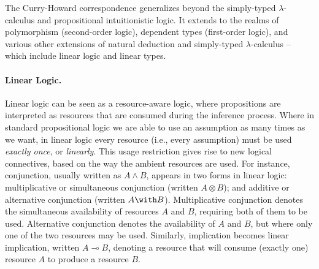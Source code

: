 \documentclass{llncs}
\newcommand{\lolli}{\multimap}
\newcommand{\tensor}{\otimes}
\newcommand{\mypara}[1]{\paragraph{\textbf{#1}.}}
\begin{document}
The Curry-Howard correspondence generalizes beyond the simply-typed
$\lambda$-calculus and propositional intuitionistic logic. It extends
to the realms of polymorphism (second-order
logic), dependent types (first-order
logic), and various other extensions of natural deduction and
simply-typed $\lambda$-calculus -- which include linear logic and
linear types.


\mypara{Linear Logic}

Linear logic \cite{DBLP:journals/tcs/Girard87} can be seen as a
resource-aware logic, where propositions are interpreted as resources
that are consumed during the inference process.  Where in standard
propositional logic we are able to use an assumption as many times as
we want, in linear logic every resource (i.e., every assumption) must
be used \emph{exactly once}, or \emph{linearly}. This usage
restriction gives rise to new logical connectives, based on the way
the ambient resources are used. For instance, conjunction, usually
written as $A\wedge B$, appears in two forms in linear logic:
multiplicative or simultaneous conjunction (written $A\tensor B$); and
additive or alternative conjunction (written $A\with
B$). Multiplicative conjunction denotes the simultaneous availability
of resources $A$ and $B$, requiring both of them to be
used. Alternative conjunction denotes the availability of $A$ and $B$,
but where only one of the two resources may be used. Similarly,
implication becomes linear implication, written $A\lolli B$,
denoting a resource that will consume (exactly one) resource $A$ to
produce a resource $B$.
\end{document}
